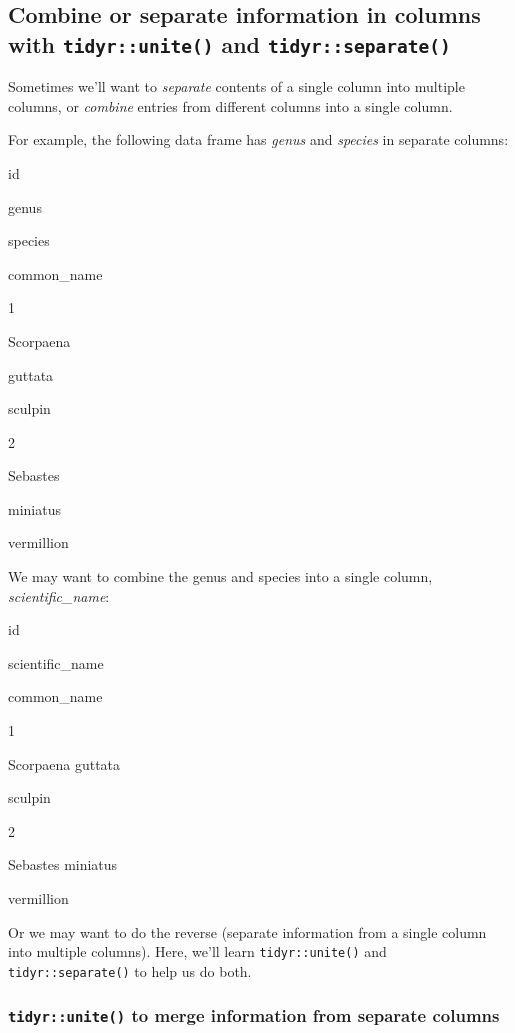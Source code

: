 \documentclass[]{book}
\begin{document}
\hypertarget{combine-or-separate-information-in-columns-with-tidyrunite-and-tidyrseparate}{%
\subsection{\texorpdfstring{Combine or separate information in columns with \texttt{tidyr::unite()} and \texttt{tidyr::separate()}}{Combine or separate information in columns with tidyr::unite() and tidyr::separate()}}\label{combine-or-separate-information-in-columns-with-tidyrunite-and-tidyrseparate}}

Sometimes we'll want to \emph{separate} contents of a single column into multiple columns, or \emph{combine} entries from different columns into a single column.

For example, the following data frame has \emph{genus} and \emph{species} in separate columns:

id

genus

species

common\_name

1

Scorpaena

guttata

sculpin

2

Sebastes

miniatus

vermillion

We may want to combine the genus and species into a single column, \emph{scientific\_name}:

id

scientific\_name

common\_name

1

Scorpaena guttata

sculpin

2

Sebastes miniatus

vermillion

Or we may want to do the reverse (separate information from a single column into multiple columns). Here, we'll learn \texttt{tidyr::unite()} and \texttt{tidyr::separate()} to help us do both.

\hypertarget{tidyrunite-to-merge-information-from-separate-columns}{%
\subsubsection{\texorpdfstring{\texttt{tidyr::unite()} to merge information from separate columns}{tidyr::unite() to merge information from separate columns}}\label{tidyrunite-to-merge-information-from-separate-columns}}
\end{document}
